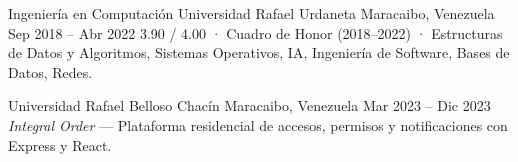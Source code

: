 

\EducationEntry%
    {Ingeniería en Computación}%
    {Universidad Rafael Urdaneta}%
    {Maracaibo, Venezuela}%
    {Sep 2018 – Abr 2022}%
    { 3.90 / 4.00 ·  Cuadro de Honor (2018–2022) ·  Estructuras de Datos y Algoritmos, Sistemas Operativos, IA, Ingeniería de Software, Bases de Datos, Redes.}

%
    {Universidad Rafael Belloso Chacín}%
    {Maracaibo, Venezuela}%
    {Mar 2023 – Dic 2023}%
    { \textit{Integral Order} — Plataforma residencial de accesos, permisos y notificaciones con Express y React.}

\CertificationDivider
{}
